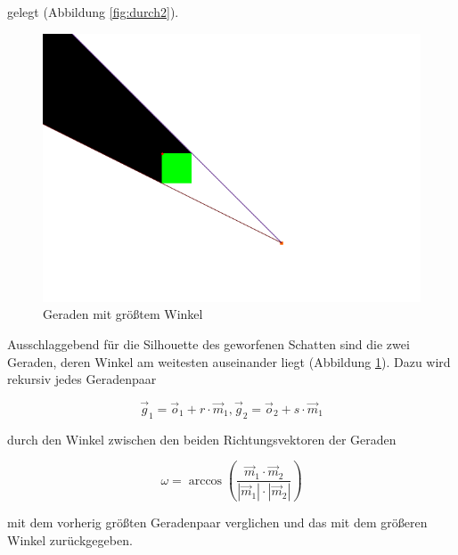 gelegt (Abbildung \ref{fig:durch2}).

\begin{figure}[t]
	\centering
	\includegraphics[width=\columnwidth]{images/durchfuehrung_4.png}
	\caption{Geraden mit größtem Winkel}
	\label{fig:durch3}
\end{figure}


Ausschlaggebend für die Silhouette des geworfenen Schatten sind die zwei Geraden, deren Winkel am
weitesten auseinander liegt (Abbildung \ref{fig:durch3}). Dazu wird rekursiv jedes Geradenpaar

\begin{equation}
	\vec{g}_1 = \vec{o}_1 + r \cdot \vec{m}_1, \vec{g}_2 = \vec{o}_2 + s \cdot \vec{m}_1
\end{equation}

durch den Winkel zwischen den beiden Richtungsvektoren der Geraden

\begin{equation}
	\omega = \arccos{\left(\frac{\vec{m}_1 \cdot \vec{m}_2}{|\vec{m}_1| \cdot |\vec{m}_2|} \right)}
\end{equation}

mit dem vorherig größten Geradenpaar verglichen und das mit dem größeren Winkel zurückgegeben.

